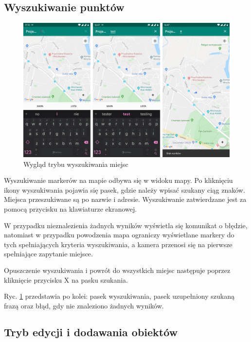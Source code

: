 \documentclass[polish,polish,a4paper,12pt]{article}
\begin{document}
	\subsection{Wyszukiwanie punktów}

	\begin{figure}[H]
		\centering
		\includegraphics[width = \textwidth]{screenshot-search}
		\caption{Wygląd trybu wyszukiwania miejsc}
		\label{fig:screenshotsearch}
	\end{figure}

	Wyszukiwanie markerów na mapie odbywa się w widoku mapy. Po kliknięciu ikony wyszukiwania pojawia się pasek, gdzie należy wpisać szukany ciąg znaków. Miejsca przeszukiwane są po nazwie i adresie. Wyszukiwanie zatwierdzane jest za pomocą przycisku na klawiaturze ekranowej.

	W przypadku nieznalezienia żadnych wyników wyświetla się komunikat o błędzie, natomiast w przypadku powodzenia mapa ograniczy wyświetlane markery do tych spełniających kryteria wyszukiwania, a kamera przenosi się na pierwsze spełniające zapytanie miejsce.

	Opuszczenie wyszukiwania i powrót do wszystkich miejsc następuje poprzez kliknięcie przycisku X na pasku szukania.

	Ryc. \ref{fig:screenshotsearch} przedstawia po kolei: pasek wyszukiwania, pasek uzupełniony szukaną frazą oraz błąd, gdy nie znaleziono żadnych wyników.

	\subsection{Tryb edycji i dodawania obiektów}
\end{document}
